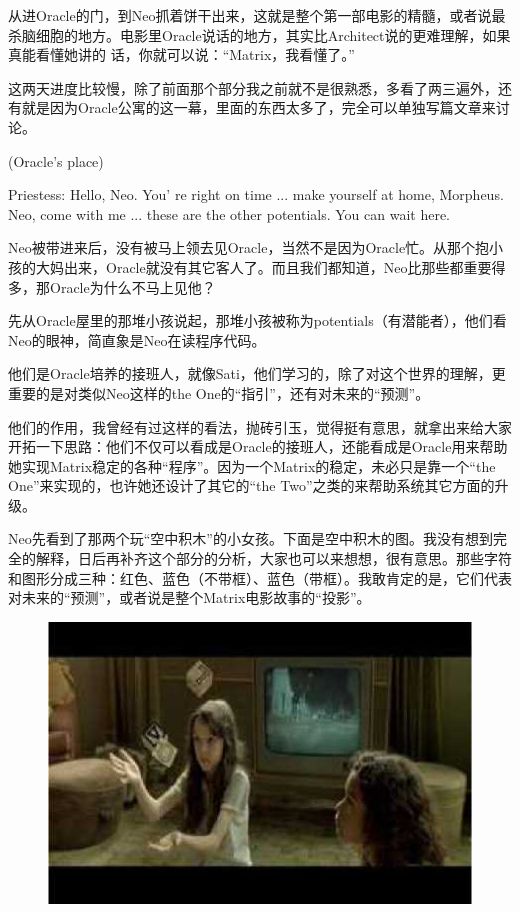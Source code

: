 \documentclass[UTF8]{ctexart}
\newenvironment{myquote}{\color{green} \setlength{\leftskip}{6em} \setlength{\rightskip}{4em} \setlength{\parindent}{-2em}}{\par}
\begin{document}
从进Oracle的门，到Neo抓着饼干出来，这就是整个第一部电影的精髓，或者说最杀脑细胞的地方。电影里Oracle说话的地方，其实比Architect说的更难理解，如果真能看懂她讲的 话，你就可以说：“Matrix，我看懂了。”

这两天进度比较慢，除了前面那个部分我之前就不是很熟悉，多看了两三遍外，还有就是因为Oracle公寓的这一幕，里面的东西太多了，完全可以单独写篇文章来讨论。

\begin{myquote}
(Oracle's place)

Priestess: Hello, Neo. You' re right on time ... make yourself at home, Morpheus. Neo, come with me ... these are the other potentials. You can wait here.
\end{myquote}

Neo被带进来后，没有被马上领去见Oracle，当然不是因为Oracle忙。从那个抱小孩的大妈出来，Oracle就没有其它客人了。而且我们都知道，Neo比那些都重要得多，那Oracle为什么不马上见他？

先从Oracle屋里的那堆小孩说起，那堆小孩被称为potentials（有潜能者），他们看Neo的眼神，简直象是Neo在读程序代码。

他们是Oracle培养的接班人，就像Sati，他们学习的，除了对这个世界的理解，更重要的是对类似Neo这样的the One的“指引”，还有对未来的“预测”。

他们的作用，我曾经有过这样的看法，抛砖引玉，觉得挺有意思，就拿出来给大家开拓一下思路：他们不仅可以看成是Oracle的接班人，还能看成是Oracle用来帮助她实现Matrix稳定的各种“程序”。因为一个Matrix的稳定，未必只是靠一个“the One”来实现的，也许她还设计了其它的“the Two”之类的来帮助系统其它方面的升级。

Neo先看到了那两个玩“空中积木”的小女孩。下面是空中积木的图。我没有想到完全的解释，日后再补齐这个部分的分析，大家也可以来想想，很有意思。那些字符和图形分成三种：红色、蓝色（不带框）、蓝色（带框）。我敢肯定的是，它们代表对未来的“预测”，或者说是整个Matrix电影故事的“投影”。

\begin{figure}[htb]
\centering
\includegraphics[width=0.5\linewidth]{fig/read_Matrix-43}
\end{figure}
\end{document}
